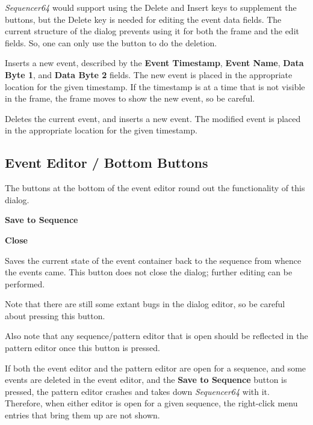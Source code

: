    \textsl{Sequencer64} would support using the Delete and Insert keys to
   supplement the buttons, but the Delete key is needed for editing the event
   data fields.  The current structure of the dialog prevents using it for both
   the frame and the edit fields.  So, one can only use the button to do the
   deletion.

   Inserts a new event, described by the 
   \textbf{Event Timestamp},
   \textbf{Event Name},
   \textbf{Data Byte 1}, and
   \textbf{Data Byte 2} fields.
   The new event is placed in the appropriate location for the given timestamp.
   If the timestamp is at a time that is not visible in the frame, the frame
   moves to show the new event, so be careful.

   Deletes the current event, and inserts a new event.
   The modified event is placed in the appropriate location for the given
   timestamp.

\subsection{Event Editor / Bottom Buttons}
\label{subsec:seq64_event_editor_buttons}

   The buttons at the bottom of the event editor round out the functionality of
   this dialog.

   \begin{enumber}
      \item \textbf{Save to Sequence}
      \item \textbf{Close}
   \end{enumber}

   \setcounter{ItemCounter}{0}      %

   Saves the current state of the event container back to the sequence from
   whence the events came.  This button does not close the dialog; further
   editing can be performed.

   Note that there are still some extant bugs in the dialog editor, so be
   careful about pressing this button.

   Also note that any sequence/pattern editor that is open should be reflected
   in the pattern editor once this button is pressed.

   If both the event editor and the pattern editor are open for a sequence, and
   some events are deleted in the event editor, and the
   \textbf{Save to Sequence} button is pressed, the pattern editor crashes and
   takes down \textsl{Sequencer64} with it.  Therefore, when either editor is
   open for a given sequence, the right-click menu entries that bring them up
   are not shown.

